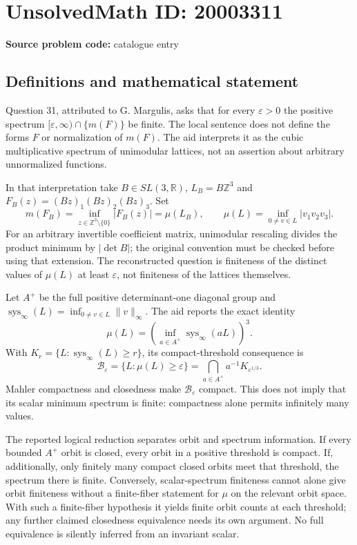 \documentclass[11pt]{article}
\newcommand{\Z}{\mathbb{Z}}
\newcommand{\R}{\mathbb{R}}
\begin{document}
\section*{UnsolvedMath ID: 20003311}
\textbf{Source problem code:} catalogue entry
\subsection{Definitions and mathematical statement}
Question 31, attributed to G. Margulis, asks that for every $\varepsilon>0$ the positive spectrum $[\varepsilon,\infty)\cap\{m(F)\}$ be finite. The local sentence does not define the forms $F$ or normalization of $m(F)$. The aid interprets it as the cubic multiplicative spectrum of unimodular lattices, not an assertion about arbitrary unnormalized functions.

In that interpretation take $B\in SL(3,\R)$, $L_B=B\Z^3$ and $F_B(z)=(Bz)_1(Bz)_2(Bz)_3$. Set
\[
 m(F_B)=\inf_{z\in\Z^3\setminus\{0\}}|F_B(z)|
 =\mu(L_B),\qquad
 \mu(L)=\inf_{0\ne v\in L}|v_1v_2v_3|.
\]
For an arbitrary invertible coefficient matrix, unimodular rescaling divides the product minimum by $|\det B|$; the original convention must be checked before using that extension. The reconstructed question is finiteness of the distinct values of $\mu(L)$ at least $\varepsilon$, not finiteness of the lattices themselves.

Let $A^+$ be the full positive determinant-one diagonal group and $\operatorname{sys}_\infty(L)=\inf_{0\ne v\in L}\|v\|_\infty$. The aid reports the exact identity
\[
 \mu(L)=\left(\inf_{a\in A^+}\operatorname{sys}_\infty(aL)\right)^3.
\]
With $K_r=\{L:\operatorname{sys}_\infty(L)\geq r\}$, its compact-threshold consequence is
\[
 \mathcal B_\varepsilon=\{L:\mu(L)\geq\varepsilon\}
 =\bigcap_{a\in A^+}a^{-1}K_{\varepsilon^{1/3}}.
\]
Mahler compactness and closedness make $\mathcal B_\varepsilon$ compact. This does not imply that its scalar minimum spectrum is finite: compactness alone permits infinitely many values.

The reported logical reduction separates orbit and spectrum information. If every bounded $A^+$ orbit is closed, every orbit in a positive threshold is compact. If, additionally, only finitely many compact closed orbits meet that threshold, the spectrum there is finite. Conversely, scalar-spectrum finiteness cannot alone give orbit finiteness without a finite-fiber statement for $\mu$ on the relevant orbit space. With such a finite-fiber hypothesis it yields finite orbit counts at each threshold; any further claimed closedness equivalence needs its own argument. No full equivalence is silently inferred from an invariant scalar.
\end{document}

